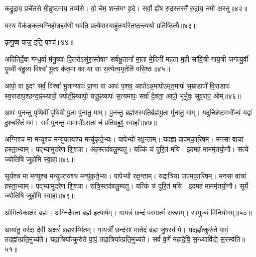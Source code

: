 कद्रु॒द्राय॒ प्रचे॑तसे मी॒ढुष्ट॑माय॒ तव्य॑से। 
वो॒ चेम॒ शन्त॑मꣳ हृ॒दे। 
सर्वो॒ ह्ये॑ष रु॒द्रस्तस्मै॑ रु॒द्राय॒ नमो॑ अस्तु॥४२॥
\anuvakamend

यस्य॒ वैक॑ङ्कत्यग्निहोत्र॒हव॑णी भवति॒ प्रत्ये॒वास्याहु॑तय\-स्तिष्ठ॒न्त्यथो॒ प्रति॑ष्ठित्यै॥४३॥
\anuvakamend


कृ॒णु॒ष्व पाज॒ इति॒ पञ्च॑॥४४॥
\anuvakamend

अदि॑तिर्दे॒वा ग॑न्ध॒र्वा म॑नु॒ष्याः᳚ पि॒तरोऽसु॑रा॒स्तेषाꣳ॑ सर्वभू॒तानां᳚ मा॒ता मे॒दिनी॑ मह॒ता म॒ही सा॑वि॒त्री गा॑य॒त्री जग॑त्यु॒र्वी पृ॒थ्वी ब॑हु॒ला विश्वा॑ भू॒ता क॑त॒मा का या सा स॒त्येत्य॒मृतेति॑ वसि॒ष्ठः॥४५॥
\anuvakamend

आपो॒ वा इ॒दꣳ सर्वं॒ विश्वा॑ भू॒तान्यापः॑ प्रा॒णा वा आपः॑ प॒शव॒ आपोऽन्न॒मापोऽमृ॑त॒मापः॑ स॒म्राडापो॑ वि॒राडापः॑ स्व॒राडाप॒श्छन्दा॒ꣴ॒स्यापो॒ ज्योती॒ꣴ॒ष्यापो॒ यजू॒ꣴ॒ष्यापः॑ स॒त्यमापः॒ सर्वा॑ दे॒वता॒ आपो॒ भूर्भुवः॒ सुव॒राप॒ ओम्॥४६॥
\anuvakamend

आपः॑ पुनन्तु पृथि॒वीं पृ॑थि॒वी पू॒ता पु॑नातु॒ माम्। 
पु॒नन्तु॒ ब्रह्म॑ण॒स्पति॒र्ब्रह्म॑पू॒ता पु॑नातु॒ माम्। 
यदुच्छि॑ष्ट॒मभो᳚ज्यं॒ यद्वा॑ दु॒श्चरि॑तं॒ मम॑। 
सर्वं॑ पुनन्तु॒ मामापो॑ऽस॒तां च॑ प्रति॒ग्रह॒ꣴ॒ स्वाहा᳚॥४७॥
\anuvakamend


अग्निश्च मा मन्युश्च मन्युपतयश्च मन्यु॑कृते॒भ्यः। 
पापेभ्यो॑ रक्ष॒न्ताम्। 
यदह्ना पाप॑मका॒रिषम्। 
मनसा वाचा॑ हस्ता॒भ्याम्। 
पद्भ्यामुदरे॑ण शि॒श्ञा। 
अह॒स्तद॑वलु॒म्पतु। 
यत्किं च॑ दुरि॒तं मयि॑। 
इदमहं माममृ॑तयो॒नौ। 
सत्ये ज्योतिषि जुहो॑मि स्वा॒हा॥४८॥
\anuvakamend


सूर्यश्च मा मन्युश्च मन्युपतयश्च मन्यु॑कृते॒भ्यः। 
पापेभ्यो॑ रक्ष॒न्ताम्। 
यद्रात्रिया पाप॑मका॒रिषम्। 
मनसा वाचा॑ हस्ता॒भ्याम्। 
पद्भ्यामुदरे॑ण शि॒श्ञा। 
रात्रि॒स्तद॑वलु॒म्पतु। 
यत्किं च॑ दुरि॒तं मयि॑। 
इदमहं माममृ॑तयो॒नौ। 
सूर्ये ज्योतिषि जुहो॑मि स्वा॒हा॥४९॥
\anuvakamend

ओमित्येकाक्ष॑रं ब्र॒ह्म। 
अग्निर्देवता ब्रह्म॑ इत्या॒र्\mbox{}षम्। 
गायत्रं छन्दं परमात्मं॑ सरू॒पम्। 
सायुज्यं वि॑नियो॒गम्॥५०॥
\anuvakamend

आया॑तु॒ वर॑दा दे॒वी॒ अ॒क्षरं॑ ब्रह्म॒सम्मि॑तम्। 
गा॒य॒त्रीं᳚ छन्द॑सां मा॒तेदं ब्र॑ह्म जु॒षस्व॑ मे। 
यदह्ना᳚त्कुरु॑ते पा॒पं॒ तदह्ना᳚त्प्रति॒मुच्य॑ते। 
यद्रात्रिया᳚त्कुरु॑ते पा॒पं॒ तद्रात्रिया᳚त्प्रति॒मुच्य॑ते। 
सर्व॑ व॒र्णे म॑हादे॒वि॒ स॒न्ध्यावि॑द्ये स॒रस्व॑ति॥५१॥ 
\anuvakamend

